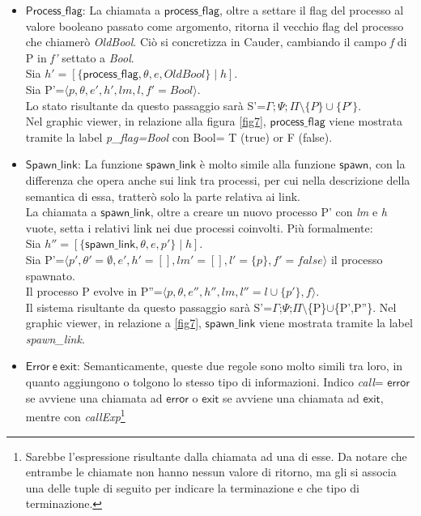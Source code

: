 \documentclass[Contributo.tex]{subfiles}
\begin{document}
	\begin{itemize}
		\item $\mathsf{Process\_flag}$: 
		La chiamata a $\mathsf{process\_flag}$, oltre a settare il flag del processo al valore booleano passato come argomento, ritorna il vecchio flag del processo che chiamerò \textit{OldBool}.
		Ciò si concretizza in Cauder, cambiando il campo \textit{f} di P in \textit{f'} settato a \textit{Bool}.\\
		Sia $\displaystyle h'=[\{\mathsf{process\_flag},\theta,e,OldBool\} \mid h ]$.\\
		Sia P'=$\displaystyle \langle p,\theta,e',h',lm,l,f'=Bool \rangle$.\\
		Lo stato risultante da questo passaggio sarà S'=$\displaystyle \Gamma;\Psi;\Pi\setminus\{P\}\cup\{P'\}$.\\
		Nel graphic viewer, in relazione alla figura \ref{fig7}, $\mathsf{process\_flag}$ viene mostrata tramite la label \textit{p\_flag=Bool} con Bool= T (true) or F (false).
		\item $\mathsf{Spawn\_link}$: 
		La funzione $\mathsf{spawn\_link}$ è molto simile alla funzione $\mathsf{spawn}$, con la differenza che opera anche sui link tra processi, per cui nella descrizione della semantica di essa, tratterò solo la parte relativa ai link.\\
		La chiamata a $\mathsf{spawn\_link}$, oltre a creare un nuovo processo P' con \textit{lm} e \textit{h} vuote, setta i relativi link nei due processi coinvolti. Più formalmente:\\
		Sia $\displaystyle h''=[\{\mathsf{spawn\_link},\theta,e,p'\} \mid h]$.\\
		Sia P'=$\displaystyle \langle p',\theta'= \emptyset,e',h'=[],lm'=[],l'=\{p\},f'=false \rangle$ il processo spawnato.\\
		Il processo P evolve in P''=$\displaystyle \langle p,\theta,e'',h'',lm,l''=l \cup\{p'\},f \rangle$.\\
		Il sistema risultante da questo passaggio sarà S'=$\Gamma$;$\Psi$;$\Pi$$\setminus$\{P\}$\cup$\{P',P''\}.
		Nel graphic viewer, in relazione a \ref{fig7}, $\mathsf{spawn\_link}$ viene mostrata tramite la label \textit{spawn\_link}.
		\item $\mathsf{Error~e~exit}$: 
		Semanticamente, queste due regole sono molto simili tra loro, in quanto aggiungono o tolgono lo stesso tipo di informazioni. Indico \textit{call}= $\mathsf{error}$ se avviene una chiamata ad $\mathsf{error}$ o $\mathsf{exit}$ se avviene una chiamata ad $\mathsf{exit}$, mentre con \textit{callExp}\footnote{Sarebbe l'espressione risultante dalla chiamata ad una di esse. Da notare che entrambe le chiamate non hanno nessun valore di ritorno, ma gli si associa una delle tuple di seguito per indicare la terminazione e che tipo di terminazione.}
$$
\end{itemize}
\end{document}
